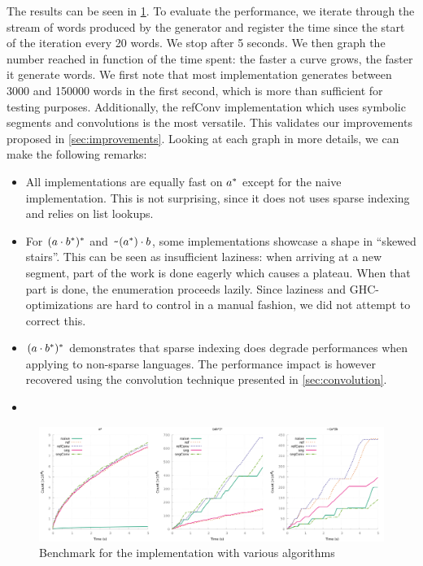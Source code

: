 
The results can be seen in \cref{bench:haskell:all}.
To evaluate the performance, we iterate through the stream of words produced by
the generator and register the time since the start of the iteration
every 20 words. We stop after 5 seconds. We then graph the number reached in
function of the time spent: the faster a curve grows, the faster it generate
words.
We first note that most implementation generates between 3000 and
150000 words in the first second, which is more than sufficient for testing
purposes.
Additionally, the refConv implementation
which uses symbolic segments and convolutions
is the most versatile. This validates our improvements
proposed in \cref{sec:improvements}.
Looking at each graph in more details, we can make the following remarks:
\begin{itemize}[leftmargin=*]
\item All implementations are equally fast on $a^*$ except
for the naive implementation. This is not surprising, since it does not uses
sparse indexing and relies on list lookups.
\item 
For $(a \cdot{b^*})^*$ and
$\texttt{\textasciitilde}{(a^*)} \cdot{b}$, some implementations showcase
a shape in ``skewed stairs''. This can be seen as insufficient laziness:
when arriving at a new segment, part of the work is done eagerly which causes
a plateau. When that part is done, the enumeration proceeds lazily.
Since laziness and GHC-optimizations are hard to control in a manual fashion,
we did not attempt to correct this.
\item $(a \cdot{b^*})^*$ demonstrates that sparse indexing
  does degrade performances when applying  to non-sparse languages.
  The performance impact is however recovered using the convolution technique
  presented in \cref{sec:convolution}.
\item {}
\end{itemize}

\begin{figure}[h]
  \centering
  \includegraphics[height=0.33\linewidth]{measure/haskell_all.png}
  \caption{Benchmark for the \haskell implementation with various algorithms}
  \label{bench:haskell:all}
\end{figure}

